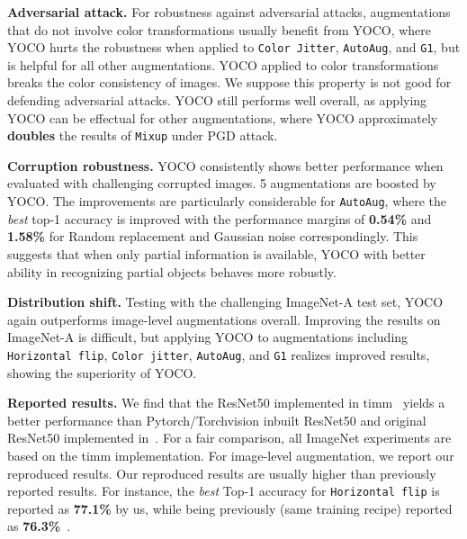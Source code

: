 \documentclass{article}
\begin{document}
\textbf{Adversarial attack.}
For robustness against adversarial attacks, augmentations that do not involve color transformations usually benefit from YOCO, where YOCO hurts the robustness when applied to \texttt{Color Jitter}, \texttt{AutoAug}, and \texttt{G1}, but is helpful for all other augmentations. YOCO applied to color transformations breaks the color consistency of images. We suppose this property is not good for defending adversarial attacks. YOCO still performs well overall, as applying YOCO can be effectual for other augmentations, where YOCO approximately \textbf{doubles} the results of \texttt{Mixup} under PGD attack. 

\textbf{Corruption robustness.}
YOCO consistently shows better performance when evaluated with challenging corrupted images. 5 augmentations are boosted by YOCO. The improvements are particularly considerable for \texttt{AutoAug}, where the \textit{best} top-1 accuracy is improved with the performance margins of \textbf{0.54\%} and \textbf{1.58\% }for Random replacement and Gaussian noise correspondingly. This suggests that when only partial information is available, YOCO with better ability in recognizing partial objects behaves more robustly. 

\textbf{Distribution shift.}
Testing with the challenging ImageNet-A test set, YOCO again outperforms image-level augmentations overall. Improving the results on ImageNet-A is difficult, but applying YOCO to augmentations including \texttt{Horizontal flip}, \texttt{Color jitter}, \texttt{AutoAug}, and \texttt{G1} realizes improved results, showing the superiority of YOCO.

\textbf{Reported results.}
We find that the ResNet50 implemented in timm~\cite{rw2019timm}  yields a better performance than Pytorch/Torchvision inbuilt ResNet50 and original ResNet50 implemented in~\cite{resnet}. For a fair comparison, all ImageNet experiments are based on the timm implementation. For image-level augmentation, we report our reproduced results. Our reproduced results are usually higher than previously reported results. For instance, the \textit{best} Top-1 accuracy for \texttt{Horizontal flip} is reported as \textbf{77.1\%} by us, while being previously (same training recipe) reported as \textbf{76.3\%}~\cite{yun2019CutMix}. 
\end{document}
